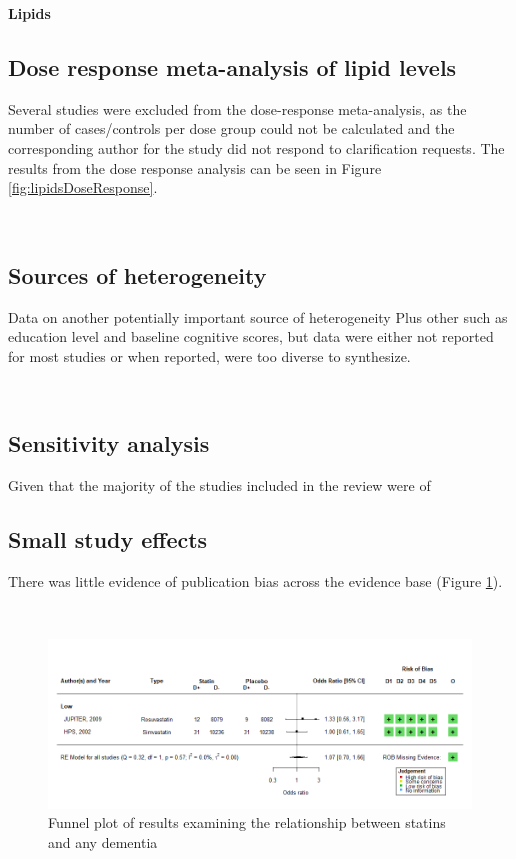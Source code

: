 \documentclass[a4paper, twoside]{templates/ociamthesis}
\begin{document}
\textbf{Lipids}

\hypertarget{dose-response-results}{%
\subsection{Dose response meta-analysis of lipid levels}\label{dose-response-results}}

Several studies were excluded from the dose-response meta-analysis, as the number of cases/controls per dose group could not be calculated and the corresponding author for the study did not respond to clarification requests. The results from the dose response analysis can be seen in Figure \ref{fig:lipidsDoseResponse}.

~

\hypertarget{sources-of-heterogeneity}{%
\subsection{Sources of heterogeneity}\label{sources-of-heterogeneity}}

Data on another potentially important source of heterogeneity
Plus other such as education level and baseline cognitive scores, but data were either not reported for most studies or when reported, were too diverse to synthesize.

~

\hypertarget{sensitivity-analysis}{%
\subsection{Sensitivity analysis}\label{sensitivity-analysis}}

Given that the majority of the studies included in the review were of

\hypertarget{sys-rev-pub-bias}{%
\subsection{Small study effects}\label{sys-rev-pub-bias}}

There was little evidence of publication bias across the evidence base (Figure \ref{fig:funnelStatinsAny}).

~





\begin{figure}[H]
\includegraphics[width=1\linewidth]{figures/sys-rev/fp_rct_statins_Dementia} \caption[Funnel plot of results examining the relationship between statins and any dementia]{Funnel plot of results examining the relationship between statins and any dementia}\label{fig:funnelStatinsAny}
\end{figure}
\end{document}
